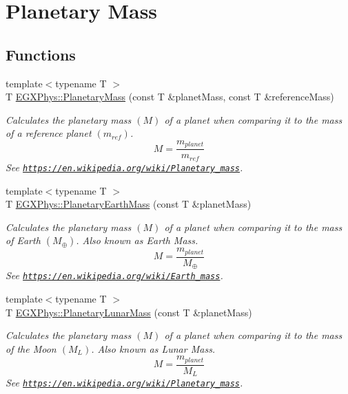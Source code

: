 \hypertarget{group___e_g_x_phys-_planetary_mass}{}\section{Planetary Mass}
\label{group___e_g_x_phys-_planetary_mass}
\subsection*{Functions}
\begin{DoxyCompactItemize}
\item 
{\footnotesize template$<$typename T $>$ }\\T \mbox{\hyperlink{group___e_g_x_phys-_planetary_mass_ga225bcf56fb37468f6d4d46493d403503}{E\+G\+X\+Phys\+::\+Planetary\+Mass}} (const T \&planet\+Mass, const T \&reference\+Mass)
\begin{DoxyCompactList}\small\item\em Calculates the planetary mass $(M)$ of a planet when comparing it to the mass of a reference planet $(m_{ref})$. \[M=\frac{m_{planet}}{m_{ref}}\] See \href{https://en.wikipedia.org/wiki/Planetary_mass}{\tt https\+://en.\+wikipedia.\+org/wiki/\+Planetary\+\_\+mass}. \end{DoxyCompactList}\item 
{\footnotesize template$<$typename T $>$ }\\T \mbox{\hyperlink{group___e_g_x_phys-_planetary_mass_ga3d918c2d37a72b42b49aa6c3da08f450}{E\+G\+X\+Phys\+::\+Planetary\+Earth\+Mass}} (const T \&planet\+Mass)
\begin{DoxyCompactList}\small\item\em Calculates the planetary mass $(M)$ of a planet when comparing it to the mass of Earth $(M_\oplus)$. Also known as Earth Mass. \[M=\frac{m_{planet}}{M_\oplus}\] See \href{https://en.wikipedia.org/wiki/Earth_mass}{\tt https\+://en.\+wikipedia.\+org/wiki/\+Earth\+\_\+mass}. \end{DoxyCompactList}\item 
{\footnotesize template$<$typename T $>$ }\\T \mbox{\hyperlink{group___e_g_x_phys-_planetary_mass_gaaea9675ef409d141d269d970f2f5e9dd}{E\+G\+X\+Phys\+::\+Planetary\+Lunar\+Mass}} (const T \&planet\+Mass)
\begin{DoxyCompactList}\small\item\em Calculates the planetary mass $(M)$ of a planet when comparing it to the mass of the Moon $(M_L)$. Also known as Lunar Mass. \[M=\frac{m_{planet}}{M_L}\] See \href{https://en.wikipedia.org/wiki/Planetary_mass}{\tt https\+://en.\+wikipedia.\+org/wiki/\+Planetary\+\_\+mass}. \end{DoxyCompactList}\item 

\end{DoxyCompactItemize}
